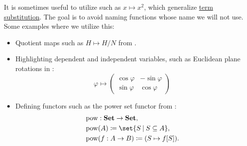 \begin{remark}\label{rem:implicit_function_notation}
  It is sometimes useful to utilize  such as \( x \mapsto x^2 \), which generalize \hyperref[def:first_order_substitution/term_in_term]{term substitution}. The goal is to avoid naming functions whose name we will not use. Some examples where we utilize this:
  \begin{itemize}
    \item Quotient maps such as \( H \mapsto H / N \) from .
    \item Highlighting dependent and independent variables, such as Euclidean plane rotations in :
    \begin{equation*}
      \varphi
      \mapsto
      \begin{pmatrix}
        \cos \varphi & -\sin \varphi \\
        \sin \varphi & \cos \varphi
      \end{pmatrix}
    \end{equation*}

    \item Defining functors such as the power set functor from :
    \begin{equation*}
      \begin{aligned}
        &\pow: \cat{Set} \to \cat{Set}, \\
        &\pow(A) \coloneqq \set{ S \given S \subseteq A }, \\
        &\pow(f: A \to B) \coloneqq (S \mapsto f[S]). \\
      \end{aligned}
    \end{equation*}
  \end{itemize}
\end{remark}


